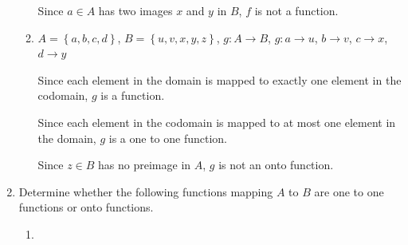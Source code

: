 \documentclass[12pt]{report}
\begin{document}
\begin{enumerate}
\begin{enumerate}
                        Since $a \in A$ has two images $x$ and $y$ in $B$, $f$ is not a function.

                  \item $A = \left\{a, b, c, d\right\}$, $B = \left\{u, v, x, y, z\right\}$, $g: A \to B$, $g: a \to u$, $b \to v$, $c \to x$, $d \to y$
                        \sol{}

                        Since each element in the domain is mapped to exactly one element in the
                        codomain, $g$ is a function.

                        Since each element in the codomain is mapped to at most one element in the
                        domain, $g$ is a one to one function.

                        Since $z \in B$ has no preimage in $A$, $g$ is not an onto function.
            \end{enumerate}

            \newpage

      \item Determine whether the following functions mapping $A$ to $B$ are one to one
            functions or onto functions.
            \begin{multicols}{2}
                  \begin{enumerate}
                        \item {}
                              \sol{}


\end{enumerate}
\end{multicols}
\end{enumerate}
\end{document}
